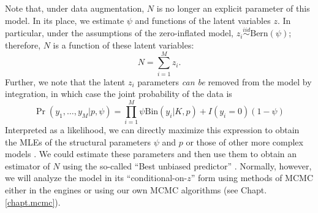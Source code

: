 Note that, under data augmentation, $N$ is no longer an explicit
parameter of this model. In its place, we estimate $\psi$ and
functions of the latent variables $z$. In particular, under the
assumptions of the zero-inflated model, $z_{i} \stackrel{iid}{\sim}
\mbox{Bern}(\psi)$; therefore, $N$ is a function of these latent
variables:
 \[
 N = \sum_{i=1}^{M} z_{i}.
\]
Further, we note that the latent $z_i$ parameters {\it can be} removed
 from
the model by integration, in which case the joint probability of the
data is
\begin{equation}
  \Pr(y_1, \ldots, y_M | p, \psi) = \prod_{i=1}^M  \psi \mathrm{Bin}(y_i | K, p) +  I(y_i=0) (1-\psi)
\end{equation}
Interpreted as a likelihood, we can directly maximize this expression
to obtain the MLEs of the structural parameters $\psi$ and $p$ or
those of other more complex models \citep[e.g., see][]{royle:2006}. We
could estimate these parameters and then use them to obtain an
estimator of $N$ using the so-called ``Best unbiased predictor''
\citep[see][]{royle_dorazio:2011}. Normally, however, we will analyze
the model in its ``conditional-on-$z$'' form using methods of MCMC
either in the \bugs engines or using our own MCMC algorithms (see
Chapt. \ref{chapt.mcmc}).

